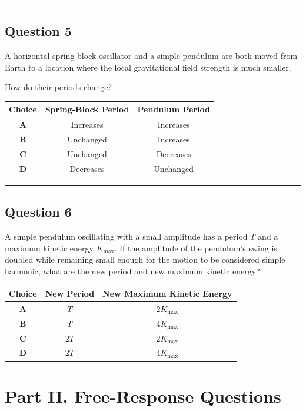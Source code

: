 \documentclass[12pt]{article}
\begin{document}
\hrule

\subsection*{Question 5}
A horizontal spring-block oscillator and a simple pendulum are both moved from Earth to a location where the local gravitational field strength is much smaller.

How do their periods change?

\begin{center}
\begin{tabular}{>{\bfseries}c c c}
\toprule
Choice & Spring-Block Period & Pendulum Period \\
\midrule
A & Increases & Increases \\
B & Unchanged & Increases \\
C & Unchanged & Decreases \\
D & Decreases & Unchanged \\
\bottomrule
\end{tabular}
\end{center}

\hrule

\subsection*{Question 6}
A simple pendulum oscillating with a small amplitude has a period $T$ and a maximum kinetic energy $K_{\max}$. If the amplitude of the pendulum's swing is doubled while remaining small enough for the motion to be considered simple harmonic, what are the new period and new maximum kinetic energy?

\begin{center}
\begin{tabular}{>{\bfseries}c c c}
\toprule
Choice & New Period & New Maximum Kinetic Energy \\
\midrule
A & $T$ & $2K_{\max}$ \\
B & $T$ & $4K_{\max}$ \\
C & $2T$ & $2K_{\max}$ \\
D & $2T$ & $4K_{\max}$ \\
\bottomrule
\end{tabular}
\end{center}

\newpage
\section*{Part II. Free-Response Questions}
\end{document}
